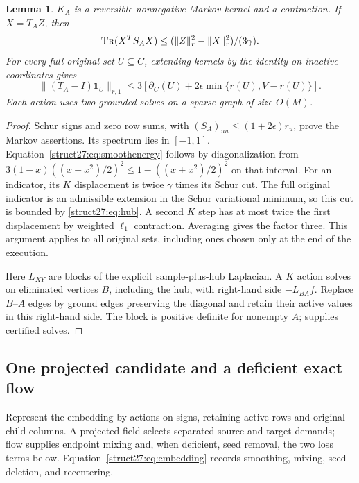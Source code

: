\documentclass[11pt]{article}
\newtheorem{lemma}[theorem]{Lemma}
\theoremstyle{remark}
\newcommand{\norm}[1]{\lVert#1\rVert}
\newcommand{\oone}{\mathds{1}}
\newcommand{\tr}{\textsc{Tr}}
\begin{document}
\begin{lemma}\label{struct27:lem:smoothing}
$K_A$ is a reversible nonnegative Markov kernel and a contraction.
If $X=T_AZ$, then
\begin{equation}\label{struct27:eq:smoothenergy}
 \tr(X^TS_AX)\le(\norm{Z}_r^2-\norm{X}_r^2)/(3\gamma).
\end{equation}
For every full original set $U\subseteq C$, extending kernels by the identity on
inactive coordinates gives
\begin{equation}\label{struct27:eq:smoothcut}
 \norm{(T_A-I)\oone_U}_{r,1}
 \le3[\partial_C(U)+2\epsilon\min\{r(U),V-r(U)\}].
\end{equation}
Each action uses two grounded solves on a sparse graph of size $O(M)$.
\end{lemma} \begin{proof} Schur signs and zero row sums, with
$(S_A)_{uu}\le(1+2\epsilon)r_u$, prove the Markov assertions.
Its spectrum lies in $[-1,1]$.
Equation~\eqref{struct27:eq:smoothenergy} follows by diagonalization from
$3(1-x)((x+x^2)/2)^2\le1-((x+x^2)/2)^2$ on that interval.
For an indicator, its $K$ displacement is twice $\gamma$ times its Schur cut.
The full original indicator is an admissible extension in the Schur variational
minimum, so this cut is bounded by \eqref{struct27:eq:hub}.
A second $K$ step has at most twice the first displacement by weighted $\ell_1$
contraction.
Averaging gives the factor three.
This argument applies to all original sets, including ones chosen only at the
end of the execution.

Here $L_{XY}$ are blocks of the explicit sample-plus-hub Laplacian.
A $K$ action solves on eliminated vertices $B$, including the hub, with
right-hand side $-L_{BA}f$.
Replace $B$--$A$ edges by ground edges preserving the diagonal and retain their
active values in this right-hand side.
The block is positive definite for nonempty $A$; 
supplies certified solves.
\end{proof}

\subsection{One projected candidate and a deficient exact flow}

Represent the embedding by actions on signs, retaining active rows and
original-child columns.
A projected field selects separated source and target demands; flow supplies
endpoint mixing and, when deficient, seed removal, the two loss terms below.
Equation~\eqref{struct27:eq:embedding} records smoothing, mixing, seed deletion,
and recentering.
\end{document}
